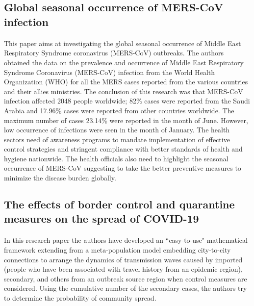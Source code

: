 \documentclass[14pt, a4paper]{extarticle}
\begin{document}
        \subsection{Global seasonal occurrence of MERS-CoV infection}
            \paragraph{} This paper aims at investigating the global seasonal occurrence of Middle East Respiratory Syndrome coronavirus (MERS-CoV) outbreaks. The authors obtained the data on the prevalence and occurrence of Middle East Respiratory Syndrome Coronavirus (MERS-CoV) infection from the World Health Organization (WHO) for all the MERS cases reported from the various countries and their allies ministries. The conclusion of this research was that MERS-CoV infection affected 2048 people worldwide; 82\% cases were reported from the Saudi Arabia and 17.96\% cases were reported from other countries worldwide. The maximum number of cases 23.14\% were reported in the month of June. However, low occurrence of infections were seen in the month of January. The health sectors need of awareness programs to mandate implementation of effective control strategies and stringent compliance with better standards of health and hygiene nationwide. The health officials also need to highlight the seasonal occurrence of MERS-CoV suggesting to take the better preventive measures to minimize the disease burden globally.
            
        \subsection{The effects of border control and quarantine measures on the spread of COVID-19}
            \paragraph{} In this research paper the authors have developed an ``easy-to-use" mathematical framework extending from a meta-population model embedding city-to-city connections to arrange the dynamics of transmission waves caused by imported (people who have been associated with travel history from an epidemic region), secondary, and others from an outbreak source region when control measures are considered. Using the cumulative number of the secondary cases, the authors try to determine the probability of community spread.
\end{document}
